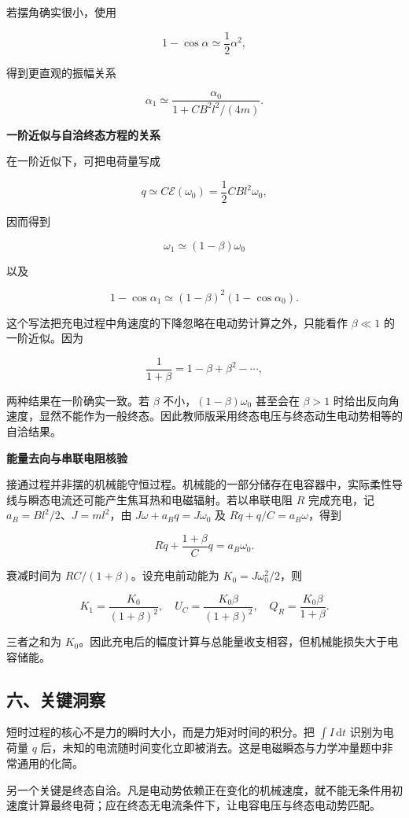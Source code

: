 \documentclass[12pt,a4paper,UTF8]{ctexart}
\begin{document}
若摆角确实很小，使用

\[1-\cos\alpha\simeq\frac12\alpha^2,\]

得到更直观的振幅关系

\[
\boxed{
\alpha_1\simeq
\frac{\alpha_0}{1+CB^2l^2/(4m)}
}.
\]

\textbf{一阶近似与自洽终态方程的关系}

在一阶近似下，可把电荷量写成

\[q\simeq C\mathcal E(\omega_0)
=\frac12CBl^2\omega_0,\]

因而得到

\[\omega_1\simeq(1-\beta)\omega_0\]

以及

\[1-\cos\alpha_1\simeq(1-\beta)^2(1-\cos\alpha_0).\]

这个写法把充电过程中角速度的下降忽略在电动势计算之外，只能看作
\(\beta\ll1\) 的一阶近似。因为

\[
\frac1{1+\beta}=1-\beta+\beta^2-\cdots,
\]

两种结果在一阶确实一致。若 \(\beta\) 不小，\((1-\beta)\omega_0\)
甚至会在 \(\beta>1\)
时给出反向角速度，显然不能作为一般终态。因此教师版采用终态电压与终态动生电动势相等的自洽结果。

\textbf{能量去向与串联电阻核验}

接通过程并非摆的机械能守恒过程。机械能的一部分储存在电容器中，实际柔性导线与瞬态电流还可能产生焦耳热和电磁辐射。若以串联电阻
\(R\) 完成充电，记 \(a_B=Bl^2/2\)、\(J=ml^2\)，由
\(J\omega+a_Bq=J\omega_0\) 及 \(R\dot q+q/C=a_B\omega\)，得到

\[R\dot q+\frac{1+\beta}{C}q=a_B\omega_0.\]

衰减时间为 \(RC/(1+\beta)\)。设充电前动能为 \(K_0=J\omega_0^2/2\)，则

\[K_1=\frac{K_0}{(1+\beta)^2},\quad
U_C=\frac{K_0\beta}{(1+\beta)^2},\quad
Q_R=\frac{K_0\beta}{1+\beta}.\]

三者之和为
\(K_0\)。因此充电后的幅度计算与总能量收支相容，但机械能损失大于电容储能。

\subsection{六、关键洞察}\label{ux516dux5173ux952eux6d1eux5bdf-2}

短时过程的核心不是力的瞬时大小，而是力矩对时间的积分。把
\(\int I\,\mathrm{d}t\) 识别为电荷量 \(q\)
后，未知的电流随时间变化立即被消去。这是电磁瞬态与力学冲量题中非常通用的化简。

另一个关键是终态自洽。凡是电动势依赖正在变化的机械速度，就不能无条件用初速度计算最终电荷；应在终态无电流条件下，让电容电压与终态电动势匹配。
\end{document}
